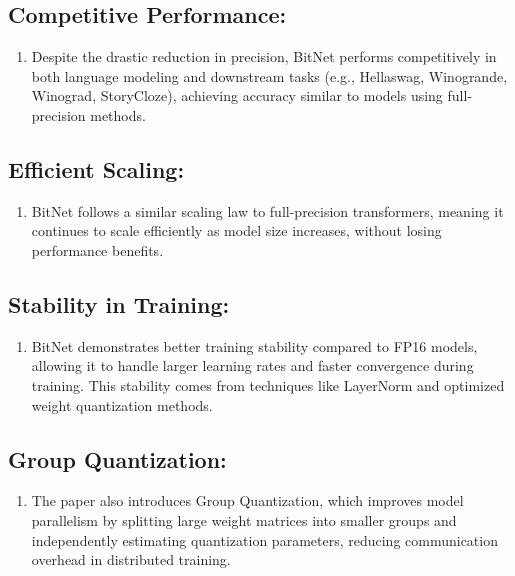 \documentclass{report}
\begin{document}
	\subsection{Competitive Performance:}
	\begin{enumerate}
		\item 
		Despite the drastic reduction in precision, BitNet performs competitively in both language modeling and downstream tasks (e.g., Hellaswag, Winogrande, Winograd, StoryCloze), achieving accuracy similar to models using full-precision methods.
	\end{enumerate}
	
	\subsection{Efficient Scaling:}
	\begin{enumerate}
		\item 
		BitNet follows a similar scaling law to full-precision transformers, meaning it continues to scale efficiently as model size increases, without losing performance benefits.
	\end{enumerate}
	
	\subsection{Stability in Training:}
	\begin{enumerate}
		\item 
		BitNet demonstrates better training stability compared to FP16 models, allowing it to handle larger learning rates and faster convergence during training. This stability comes from techniques like LayerNorm and optimized weight quantization methods.
	\end{enumerate}
	
	\subsection{Group Quantization:}
	\begin{enumerate}
		\item 
		The paper also introduces Group Quantization, which improves model parallelism by splitting large weight matrices into smaller groups and independently estimating quantization parameters, reducing communication overhead in distributed training.
	\end{enumerate}
	
	
	
	
	
\end{document}
